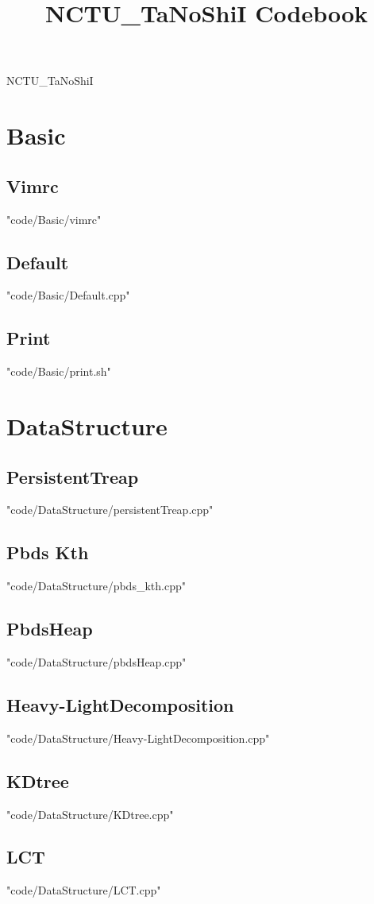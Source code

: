 \documentclass [8pt,a4paper,twocolumn]{article}
\title {NCTU\_TaNoShiI Codebook}
\begin{document}
\thispagestyle{fancy}
{ \Huge NCTU\_TaNoShiI}
\tableofcontents

\section{Basic}
\subsection{Vimrc}
 {"code/Basic/vimrc"}
\subsection{Default}
 {"code/Basic/Default.cpp"}
\subsection{Print}
 {"code/Basic/print.sh"}
\section{DataStructure}
\subsection{PersistentTreap}
 {"code/DataStructure/persistentTreap.cpp"}
\subsection{Pbds Kth}
 {"code/DataStructure/pbds_kth.cpp"}
\subsection{PbdsHeap}
 {"code/DataStructure/pbdsHeap.cpp"}
\subsection{Heavy-LightDecomposition}
 {"code/DataStructure/Heavy-LightDecomposition.cpp"}
\subsection{KDtree}
 {"code/DataStructure/KDtree.cpp"}
\subsection{LCT}
 {"code/DataStructure/LCT.cpp"}
\end{document}
